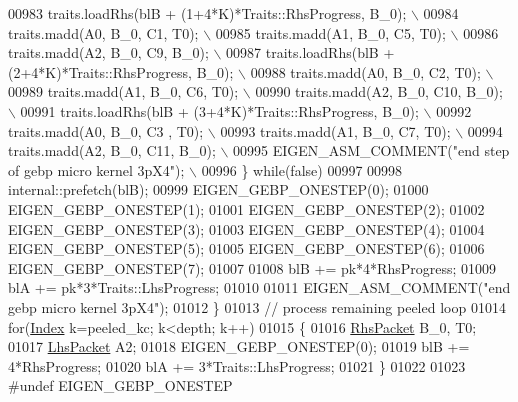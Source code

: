 \begin{DoxyCode}
00983 \textcolor{preprocessor}{              traits.loadRhs(blB + (1+4*K)*Traits::RhsProgress, B\_0); \(\backslash\)}
00984 \textcolor{preprocessor}{              traits.madd(A0, B\_0, C1, T0); \(\backslash\)}
00985 \textcolor{preprocessor}{              traits.madd(A1, B\_0, C5, T0); \(\backslash\)}
00986 \textcolor{preprocessor}{              traits.madd(A2, B\_0, C9, B\_0); \(\backslash\)}
00987 \textcolor{preprocessor}{              traits.loadRhs(blB + (2+4*K)*Traits::RhsProgress, B\_0); \(\backslash\)}
00988 \textcolor{preprocessor}{              traits.madd(A0, B\_0, C2,  T0); \(\backslash\)}
00989 \textcolor{preprocessor}{              traits.madd(A1, B\_0, C6,  T0); \(\backslash\)}
00990 \textcolor{preprocessor}{              traits.madd(A2, B\_0, C10, B\_0); \(\backslash\)}
00991 \textcolor{preprocessor}{              traits.loadRhs(blB + (3+4*K)*Traits::RhsProgress, B\_0); \(\backslash\)}
00992 \textcolor{preprocessor}{              traits.madd(A0, B\_0, C3 , T0); \(\backslash\)}
00993 \textcolor{preprocessor}{              traits.madd(A1, B\_0, C7,  T0); \(\backslash\)}
00994 \textcolor{preprocessor}{              traits.madd(A2, B\_0, C11, B\_0); \(\backslash\)}
00995 \textcolor{preprocessor}{              EIGEN\_ASM\_COMMENT("end step of gebp micro kernel 3pX4"); \(\backslash\)}
00996 \textcolor{preprocessor}{            \} while(false)}
00997 
00998             internal::prefetch(blB);
00999             EIGEN\_GEBP\_ONESTEP(0);
01000             EIGEN\_GEBP\_ONESTEP(1);
01001             EIGEN\_GEBP\_ONESTEP(2);
01002             EIGEN\_GEBP\_ONESTEP(3);
01003             EIGEN\_GEBP\_ONESTEP(4);
01004             EIGEN\_GEBP\_ONESTEP(5);
01005             EIGEN\_GEBP\_ONESTEP(6);
01006             EIGEN\_GEBP\_ONESTEP(7);
01007 
01008             blB += pk*4*RhsProgress;
01009             blA += pk*3*Traits::LhsProgress;
01010 
01011             EIGEN\_ASM\_COMMENT(\textcolor{stringliteral}{"end gebp micro kernel 3pX4"});
01012           \}
01013           \textcolor{comment}{// process remaining peeled loop}
01014           \textcolor{keywordflow}{for}(\hyperlink{namespace_eigen_a62e77e0933482dafde8fe197d9a2cfde}{Index} k=peeled\_kc; k<depth; k++)
01015           \{
01016             \hyperlink{class_eigen_1_1internal_1_1_tensor_lazy_evaluator_writable}{RhsPacket} B\_0, T0;
01017             \hyperlink{class_eigen_1_1internal_1_1_tensor_lazy_evaluator_writable}{LhsPacket} A2;
01018             EIGEN\_GEBP\_ONESTEP(0);
01019             blB += 4*RhsProgress;
01020             blA += 3*Traits::LhsProgress;
01021           \}
01022 
01023 \textcolor{preprocessor}{#undef EIGEN\_GEBP\_ONESTEP}

\end{DoxyCode}
